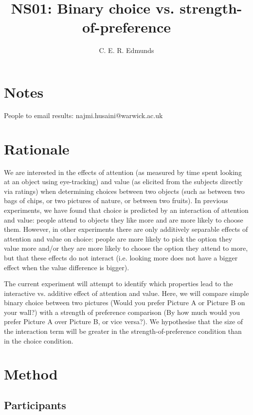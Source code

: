 \documentclass[12pt]{article}
\title{NS01: Binary choice vs. strength-of-preference}
\author{C. E. R. Edmunds}
\date{}
\begin{document}
\maketitle

\doublespacing

\section{Notes}
People to email results: najmi.husaini@warwick.ac.uk

\section{Rationale}

We are interested in the effects of attention (as measured by time spent looking at an object using eye-tracking) and value (as elicited from the subjects directly via ratings) when determining choices between two objects (such as between two bags of chips, or two pictures of nature, or between two fruits). In previous experiments, we have found that choice is predicted by an interaction of attention and value: people attend to objects they like more and are more likely to choose them. However, in other experiments there are only additively separable effects of attention and value on choice: people are more likely to pick the option they value more and/or they are more likely to choose the option they attend to more, but that these effects do not interact (i.e. looking more does not have a bigger effect when the value difference is bigger). 
 
The current experiment will attempt to identify which properties lead to the interactive vs. additive effect of attention and value. Here, we will compare simple binary choice between two pictures (Would you prefer Picture A or Picture B on your wall?) with a strength of preference comparison (By how much would you prefer Picture A over Picture B, or vice versa?). We hypothesise that the size of the interaction term will be greater in the strength-of-preference condition than in the choice condition. 

\section{Method}
\subsection{Participants}
\end{document}
